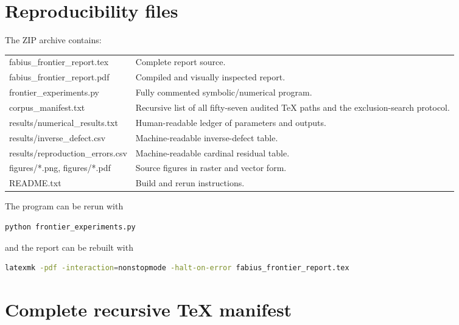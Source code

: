 \documentclass[11pt,oneside]{article}
\theoremstyle{definition}
\theoremstyle{remark}
\begin{document}
\section{Reproducibility files}
\label{app:reproducibility}
The ZIP archive contains:
\begin{center}
\begin{tabularx}{0.96\textwidth}{@{}>{\footnotesize\ttfamily\raggedright\arraybackslash}p{}X@{}}
\toprule
fabius\_frontier\_report.tex & Complete report source.\\
fabius\_frontier\_report.pdf & Compiled and visually inspected report.\\
frontier\_experiments.py & Fully commented symbolic/numerical program.\\
corpus\_manifest.txt & Recursive list of all fifty-seven audited TeX paths and the exclusion-search protocol.\\
results/numerical\_results.txt & Human-readable ledger of parameters and outputs.\\
results/inverse\_defect.csv & Machine-readable inverse-defect table.\\
results/reproduction\_errors.csv & Machine-readable cardinal residual table.\\
figures/*.png, figures/*.pdf & Source figures in raster and vector form.\\
README.txt & Build and rerun instructions.\\
\bottomrule
\end{tabularx}
\end{center}
The program can be rerun with
\begin{lstlisting}[style=code,language=bash]
python frontier_experiments.py
\end{lstlisting}
and the report can be rebuilt with
\begin{lstlisting}[style=code,language=bash]
latexmk -pdf -interaction=nonstopmode -halt-on-error fabius_frontier_report.tex
\end{lstlisting}

\section{Complete recursive TeX manifest}
\label{app:manifest}

\end{document}
